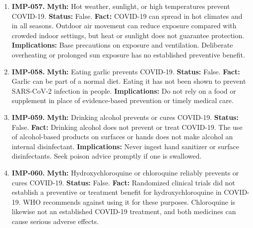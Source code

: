 \documentclass[11pt,oneside]{book}
\begin{document}
\begin{enumerate}[leftmargin=0pt,labelwidth=0pt,labelsep=0pt,itemindent=0pt]
\textbf{Status:} False.\newline
\textbf{Fact:} COVID-19 is caused by infection with SARS-CoV-2. Radio signals from mobile networks cannot transmit a respiratory virus. Transmission also occurs in places without 5G coverage. \cite{ref51}\newline
\textbf{Implications:} Use infection prevention measures that address respiratory spread, including ventilation in shared indoor spaces.
\item[] \textbf{IMP-057.} \textbf{Myth:} Hot weather, sunlight, or high temperatures prevent COVID-19.\newline
\textbf{Status:} False.\newline
\textbf{Fact:} COVID-19 can spread in hot climates and in all seasons. Outdoor air movement can reduce exposure compared with crowded indoor settings, but heat or sunlight does not guarantee protection. \cite{ref51}\newline
\textbf{Implications:} Base precautions on exposure and ventilation. Deliberate overheating or prolonged sun exposure has no established preventive benefit.
\item[] \textbf{IMP-058.} \textbf{Myth:} Eating garlic prevents COVID-19.\newline
\textbf{Status:} False.\newline
\textbf{Fact:} Garlic can be part of a normal diet. Eating it has not been shown to prevent SARS-CoV-2 infection in people. \cite{ref51}\newline
\textbf{Implications:} Do not rely on a food or supplement in place of evidence-based prevention or timely medical care.
\item[] \textbf{IMP-059.} \textbf{Myth:} Drinking alcohol prevents or cures COVID-19.\newline
\textbf{Status:} False.\newline
\textbf{Fact:} Drinking alcohol does not prevent or treat COVID-19. The use of alcohol-based products on surfaces or hands does not make alcohol an internal disinfectant. \cite{ref51}\newline
\textbf{Implications:} Never ingest hand sanitizer or surface disinfectants. Seek poison advice promptly if one is swallowed.
\item[] \textbf{IMP-060.} \textbf{Myth:} Hydroxychloroquine or chloroquine reliably prevents or cures COVID-19.\newline
\textbf{Status:} False.\newline
\textbf{Fact:} Randomized clinical trials did not establish a preventive or treatment benefit for hydroxychloroquine in COVID-19. WHO recommends against using it for these purposes. Chloroquine is likewise not an established COVID-19 treatment, and both medicines can cause serious adverse effects. \cite{ref418,ref51}\newline

\end{enumerate}
\end{document}
